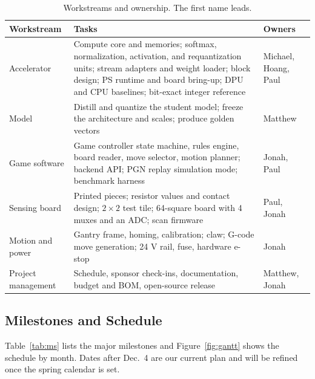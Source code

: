 \documentclass[10pt]{article}
\begin{document}
\begin{table}[H]
\centering\small
\caption{Workstreams and ownership. The first name leads.}\label{tab:own}
\begin{tabularx}{\textwidth}{@{}P{2.3cm} L P{2.9cm}@{}}
\toprule
\textbf{Workstream} & \textbf{Tasks} & \textbf{Owners} \\
\midrule
Accelerator & Compute core and memories; softmax, normalization, activation, and requantization units; stream adapters and weight loader; block design; PS runtime and board bring-up; DPU and CPU baselines; bit-exact integer reference & Michael, Hoang, Paul \\
Model & Distill and quantize the student model; freeze the architecture and scales; produce golden vectors & Matthew \\
Game software & Game controller state machine, rules engine, board reader, move selector, motion planner; backend API; PGN replay simulation mode; benchmark harness & Jonah, Paul \\
Sensing board & Printed pieces; resistor values and contact design; $2\times2$ test tile; 64-square board with 4 muxes and an ADC; scan firmware & Paul, Jonah \\
Motion and power & Gantry frame, homing, calibration; claw; G-code move generation; 24 V rail, fuse, hardware e-stop & Jonah \\
Project management & Schedule, sponsor check-ins, documentation, budget and BOM, open-source release & Matthew, Jonah \\
\bottomrule
\end{tabularx}
\end{table}

\subsection{Milestones and Schedule}

Table~\ref{tab:ms} lists the major milestones and Figure~\ref{fig:gantt} shows the schedule by month.
Dates after Dec.~4 are our current plan and will be refined once the spring calendar is
set.
\end{document}
